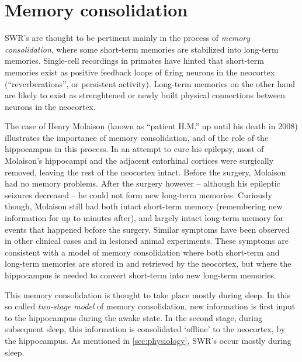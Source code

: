 \section{Memory consolidation}

SWR's are thought to be pertinent mainly in the process of \emph{memory consolidation}, where some short-term memories are stabilized into long-term memories. Single-cell recordings in primates have hinted that short-term memories exist as positive feedback loops of firing neurons in the neocortex (``reverberations'', or persistent activity). Long-term memories on the other hand are likely to exist as strenghtened or newly built physical connections between neurons in the neocortex. \cite{Kandel2013,Bear2015,Purves2017}

The case of Henry Molaison (known as ``patient H.M.'' up until his death in 2008) illustrates the importance of memory consolidation, and of the role of the hippocampus in this process. In an attempt to cure his epilepsy, most of Molaison's hippocampi and the adjacent entorhinal cortices were surgically removed, leaving the rest of the neocortex intact. Before the surgery, Molaison had no memory problems. After the surgery however -- although his epileptic seizures decreased -- he could not form new long-term memories.\footnotemark{} Curiously though, Molaison still had both intact short-term memory (remembering new information for up to minutes after), and largely intact long-term memory for events that happened before the surgery. Similar symptoms have been observed in other clinical cases and in lesioned animal experiments. These symptoms are consistent with a model of memory consolidation where both short-term and long-term memories are stored in and retrieved by the neocortex, but where the hippocampus is needed to convert short-term into new long-term memories. \cite{Kandel2013,Purves2017}


This memory consolidation is thought to take place mostly during sleep. In this so called \emph{two-stage model} of memory consolidation, new information is first input to the hippocampus during the awake state. In the second stage, during subsequent sleep, this information is consolidated `offline' to the neocortex, by the hippocampus. As mentioned in \cref{sec:physiology}, SWR's occur mostly during sleep.





